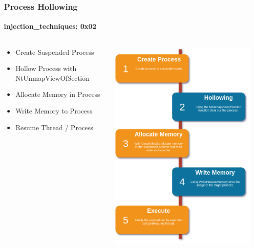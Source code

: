 \documentclass[aspectratio=169]{beamer}
\begin{document}
\begin{frame}
  \frametitle{Process Hollowing}
  \framesubtitle{injection\_techniques: 0x02}
  \begin{columns}
    \begin{column}{.5\textwidth}
      \begin{itemize}
      \item{Create Suspended Process}
      \item{Hollow Process with NtUnmapViewOfSection}
      \item{Allocate Memory in Process}
      \item{Write Memory to Process}
      \item{Resume Thread / Process}
      \end{itemize}
    \end{column}
    \hfill
    \begin{column}{.5\textwidth}
      \begin{center}
        \includegraphics[scale=0.35]{process-hollowing}
      \end{center}
    \end{column}
  \end{columns}
\end{frame}
\end{document}
